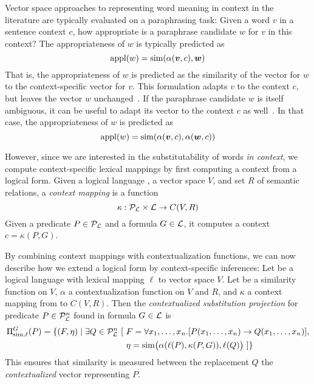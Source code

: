 
Vector space approaches to representing word meaning in context in the
literature are typically evaluated on a paraphrasing task: Given a
word $v$ in a sentence context $c$, how appropriate is a paraphrase
candidate 
$w$ for $v$ in this context? The appropriateness of $w$ is typically
predicted as 
\[ \mathrm{appl}(w) = \simfunc(\alpha(\vec v, c), \vec w)\] 
That is, the appropriateness of $w$ is predicted as the similarity of
the vector for $w$ to the context-specific vector for $v$. This
formulation adapts $v$ to the context $c$, but leaves the vector $w$  
unchanged~\citep{erk:emnlp08,MitchellLapata:08,ThaterFuerstenauPinkal:10,vandecruys:emnlp2011}.
If the paraphrase candidate $w$ is itself ambiguous, it can be useful
to adapt its vector to the context $c$ as
well~\citep{erk:acl2010}. In that case, the appropriateness of $w$ is
predicted as 
\[ \mathrm{appl}(w) = \simfunc(\alpha(\vec v, c), \alpha(\vec w, c)) \]




However, since we are interested in the substitutability of words {\it in
context}, we compute context-specific lexical mappings by first computing a
context from a logical form. Given a logical language \loglang, a vector space
$V$, and set $R$ of semantic relations, a \textit{context mapping} is a function
\[ \kappa: {\cal{P}}_{{\cal{L}}} \times {\cal{L}} \to C(V, R) \] Given a predicate
$P \in {\cal{P}}_{{\cal{L}}}$ and a formula $G \in {\cal{L}}$, it computes a context
$c = \kappa(P, G)$.

By combining context mappings with contextualization functions, we can now
describe how we extend a logical form by context-specific inferences: Let
\loglang be a logical language with lexical mapping $\ell$ to vector space $V$.
Let \simfunc{} be a similarity function on $V$, $\alpha$ a contextualization function
on $V$ and $R$, and $\kappa$ a context mapping from \loglang to $C(V, R)$.
Then the \textit{contextualized substitution projection} for predicate $P \in
{\cal{P}}_{{\cal{L}}}^n$ found in formula $G \in {\cal{L}}$ is
\begin{align*}
\Pi^G_{\mathrm{sim}, \ell}(P) = \{ (F, \eta) \mid \exists Q \in {\cal{P}}_{{\cal{L}}}^n~[ 
&~F = \forall x_1, \ldots, x_n.[P(x_1, \ldots, x_n) \to Q(x_1, \ldots, x_n)], \\
&~\eta = \mathrm{sim}\big(\alpha(\ell(P), \kappa(P, G)), \ell(Q)\big) ~] \}
\end{align*}
This ensures that similarity is measured between the replacement $Q$ the {\em contextualized}
vector representing $P$.

